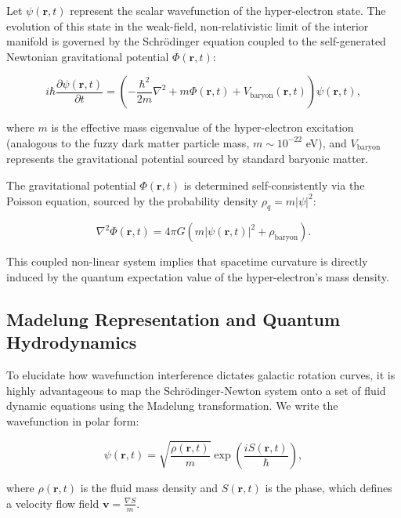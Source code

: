 Let $\psi(\mathbf{r}, t)$ represent the scalar wavefunction of the hyper-electron state. The evolution of this state in the weak-field, non-relativistic limit of the interior manifold is governed by the Schrödinger equation coupled to the self-generated Newtonian gravitational potential $\Phi(\mathbf{r},t)$:

\begin{equation}
i \hbar \frac{\partial \psi(\mathbf{r},t)}{\partial t} = \left( -\frac{\hbar^2}{2m} \nabla^2 + m \Phi(\mathbf{r},t) + V_{\text{baryon}}(\mathbf{r},t) \right) \psi(\mathbf{r},t),
\label{eq:schrodinger}
\end{equation}

where $m$ is the effective mass eigenvalue of the hyper-electron excitation (analogous to the fuzzy dark matter particle mass, $m \sim 10^{-22}$ eV), and $V_{\text{baryon}}$ represents the gravitational potential sourced by standard baryonic matter.

The gravitational potential $\Phi(\mathbf{r},t)$ is determined self-consistently via the Poisson equation, sourced by the probability density $\rho_q = m|\psi|^2$:

\begin{equation}
\nabla^2 \Phi(\mathbf{r},t) = 4 \pi G \left( m |\psi(\mathbf{r},t)|^2 + \rho_{\text{baryon}} \right).
\label{eq:poisson}
\end{equation}

This coupled non-linear system implies that spacetime curvature is directly induced by the quantum expectation value of the hyper-electron's mass density.

\subsection{Madelung Representation and Quantum Hydrodynamics}

To elucidate how wavefunction interference dictates galactic rotation curves, it is highly advantageous to map the Schrödinger-Newton system onto a set of fluid dynamic equations using the Madelung transformation. We write the wavefunction in polar form:

\begin{equation}
\psi(\mathbf{r},t) = \sqrt{\frac{\rho(\mathbf{r},t)}{m}} \exp\left( \frac{i S(\mathbf{r},t)}{\hbar} \right),
\label{eq:madelung}
\end{equation}

where $\rho(\mathbf{r},t)$ is the fluid mass density and $S(\mathbf{r},t)$ is the phase, which defines a velocity flow field $\mathbf{v} = \frac{\nabla S}{m}$.

